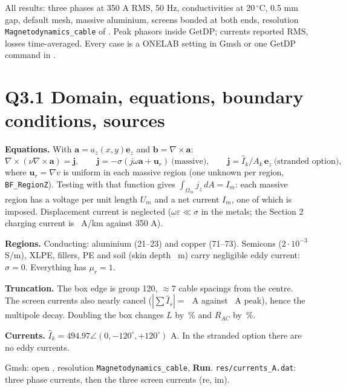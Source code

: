 \def\ReportNumber{3}
\def\ReportName{Magnetoquasistatic analysis}

\usepackage{pgfplots}\pgfplotsset{compat=1.18}
\graphicspath{{../../Slides/figures/}}


All results: three phases at 350 A RMS, 50 Hz, conductivities at 20\,\(^\circ\)C, 0.5 mm gap, default
mesh, massive aluminium, screens bonded at both ends, resolution \texttt{Magnetodynamics\_cable} of \mfile. Peak phasors
inside GetDP; currents reported RMS, losses time-averaged. Every case is a ONELAB setting in Gmsh or one GetDP command in \readme.

\section*{Q3.1 Domain, equations, boundary conditions, sources}
\assignmentquestion{\QuestionThreeOne}
\answer{\AnsThreeOne}
\textbf{Equations.} With \(\mathbf a=a_z(x,y)\mathbf e_z\) and \(\mathbf b=\nabla\times\mathbf a\):
\[
 \nabla\times(\nu\nabla\times\mathbf a)=\mathbf j,\qquad
 \mathbf j=-\sigma(j\omega\mathbf a+\mathbf u_r)\ \text{(massive)},\qquad
 \mathbf j=\hat I_k/A_k\,\mathbf e_z\ \text{(stranded option)},
\]
where \(\mathbf u_r=\nabla v\) is uniform in each massive region (one unknown per region,
\texttt{BF\_RegionZ}). Testing with that function gives \(\int_{\Omega_m}j_z\,dA=I_m\): each massive
region has a voltage per unit length \(U_m\) and a net current \(I_m\), one of which is imposed.
Displacement current is neglected (\(\omega\varepsilon\ll\sigma\) in the metals; the Section 2 charging
current is \AnaIch\ A/km against 350 A).

\textbf{Regions.} Conducting: aluminium (21--23) and copper (71--73). Semicons
(\(2\cdot10^{-3}\) S/m), XLPE, fillers, PE and soil (skin depth \AnaDeltaSoil\ m) carry negligible eddy
current: \(\sigma=0\). Everything has \(\mu_r=1\).

\textbf{Truncation.} The box edge is group 120, \(\approx7\) cable spacings from the centre. The
screen currents also nearly cancel (\(|\sum\hat I_s|=\)\,\IsSum\ A against \IsPeak\ A peak), hence the
multipole decay. Doubling the box changes \(L\) by \dLbox\,\% and \(R_{AC}\) by \dRacbox\,\%.

\textbf{Currents.} \(\hat I_k=494.97\angle(0,-120^\circ,+120^\circ)\) A. In the stranded option there are no
eddy currents.

\begin{center}
\end{center}
{Gmsh: open \mfile, resolution \texttt{Magnetodynamics\_cable}, \textbf{Run}.}
{\texttt{res/currents\_A.dat}: three phase currents, then the three screen currents (re, im).}

